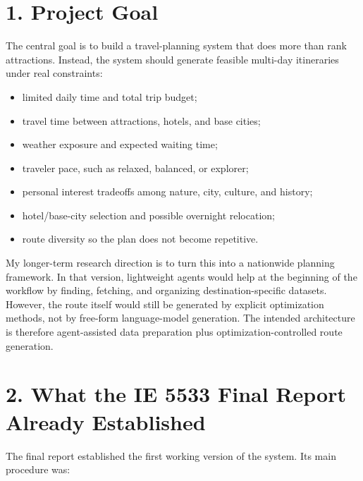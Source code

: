 \documentclass[11pt,a4paper]{article}
\begin{document}
\newpage

\section*{1. Project Goal}

\noindent The central goal is to build a travel-planning system that does more than rank attractions. Instead, the system should generate feasible multi-day itineraries under real constraints:

\begin{itemize}
    \item limited daily time and total trip budget;
    \item travel time between attractions, hotels, and base cities;
    \item weather exposure and expected waiting time;
    \item traveler pace, such as relaxed, balanced, or explorer;
    \item personal interest tradeoffs among nature, city, culture, and history;
    \item hotel/base-city selection and possible overnight relocation;
    \item route diversity so the plan does not become repetitive.
\end{itemize}

\noindent My longer-term research direction is to turn this into a nationwide planning framework. In that version, lightweight agents would help at the beginning of the workflow by finding, fetching, and organizing destination-specific datasets. However, the route itself would still be generated by explicit optimization methods, not by free-form language-model generation. The intended architecture is therefore agent-assisted data preparation plus optimization-controlled route generation.

\section*{2. What the IE 5533 Final Report Already Established}

\noindent The final report established the first working version of the system. Its main procedure was:
\end{document}
